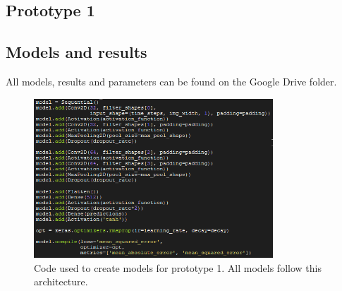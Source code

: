 \documentclass[12pt, twoside]{article}
\begin{document}
\begin{appendices}
	\section{Prototype 1}
	\subsection{Models and results}
	All models, results and parameters can be found on the Google Drive folder.
	
	\begin{figure}
		\centering
		\includegraphics[width=0.8\textwidth]{../images/architecture_proto1.png}
		\caption{Code used to create models for prototype 1. All models follow this architecture.}
		\label{architecture_proto1}
	\end{figure}


\end{appendices}
\end{document}
